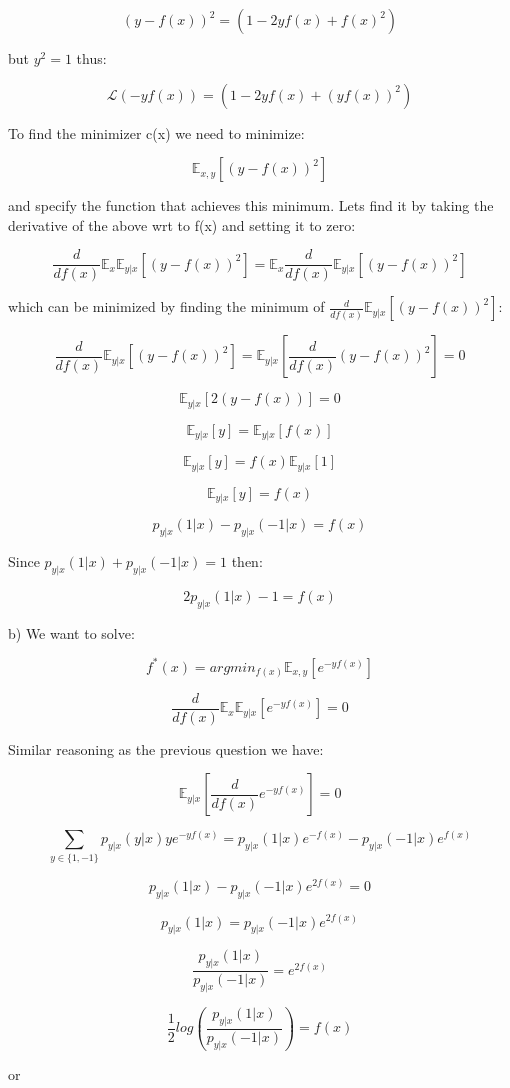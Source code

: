 \documentclass[12pt]{report}
\begin{document}
$$(y-f(x))^2 = (1 - 2yf(x) + f(x)^2) $$

but $y^2 = 1$ thus:

$$\mathcal{L}(-yf(x)) = (1 - 2yf(x) + (yf(x))^2)$$

To find the minimizer c(x) we need to minimize: 

$$\mathbb{E}_{x,y}[(y-f(x))^2]$$

and specify the function that achieves this minimum. Lets find it by taking the derivative of the above wrt to f(x) and setting it to zero:

$$\frac{d}{df(x)}\mathbb{E}_{x}\mathbb{E}_{y|x}[(y-f(x))^2] = \mathbb{E}_{x}\frac{d}{df(x)}\mathbb{E}_{y|x}[(y-f(x))^2]$$

which can be minimized by finding the minimum of $\frac{d}{df(x)}\mathbb{E}_{y|x}[(y-f(x))^2]$:

$$ \frac{d}{df(x)}\mathbb{E}_{y|x}[(y-f(x))^2] =  \mathbb{E}_{y|x} \left[ \frac{d}{df(x)}(y-f(x))^2 \right] = 0$$

$$\mathbb{E}_{y|x}[2(y-f(x))] = 0$$

$$\mathbb{E}_{y|x}[y] = \mathbb{E}_{y|x}[f(x)] $$

$$\mathbb{E}_{y|x}[y] = f(x)\mathbb{E}_{y|x}[1] $$

$$\mathbb{E}_{y|x}[y] = f(x) $$

$$p_{y|x}(1|x) - p_{y|x}(-1|x) = f(x)$$

Since $p_{y|x}(1|x) + p_{y|x}(-1|x) = 1$ then:

$$2p_{y|x}(1|x) - 1 = f(x) $$

b) We want to solve:

$$f^{*}(x) =  argmin_{f(x)} \mathbb{E}_{x,y}[e^{-yf(x)}]$$

$$\frac{d}{df(x)}\mathbb{E}_{x}\mathbb{E}_{y|x} [e^{-yf(x)}] = 0 $$

Similar reasoning as the previous question we have:

$$\mathbb{E}_{y|x} \left[ \frac{d}{df(x)}e^{-yf(x)} \right] = 0 $$

$$\sum_{y \in \{1, -1 \}}p_{y|x}(y|x)ye^{-yf(x)} = p_{y|x}(1|x)e^{-f(x)} - p_{y|x}(-1|x)e^{f(x)}$$

$$p_{y|x}(1|x) - p_{y|x}(-1|x)e^{2f(x)} = 0$$

$$p_{y|x}(1|x) = p_{y|x}(-1|x)e^{2f(x)}$$

$$\frac{p_{y|x}(1|x)}{p_{y|x}(-1|x)} = e^{2f(x)}$$

$$\frac{1}{2}log\left( \frac{p_{y|x}(1|x)}{p_{y|x}(-1|x)} \right) = f(x)$$

or 
\end{document}
